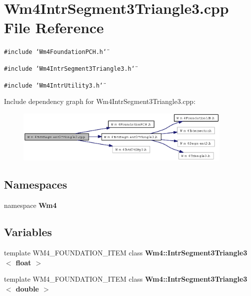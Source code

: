 \section{Wm4Intr\-Segment3Triangle3.cpp File Reference}
\label{Wm4IntrSegment3Triangle3_8cpp}
{\tt \#include \char`\"{}Wm4Foundation\-PCH.h\char`\"{}}\par
{\tt \#include \char`\"{}Wm4Intr\-Segment3Triangle3.h\char`\"{}}\par
{\tt \#include \char`\"{}Wm4Intr\-Utility3.h\char`\"{}}\par


Include dependency graph for Wm4Intr\-Segment3Triangle3.cpp:\begin{figure}[H]
\begin{center}
\leavevmode
\includegraphics[width=297pt]{Wm4IntrSegment3Triangle3_8cpp__incl}
\end{center}
\end{figure}
\subsection*{Namespaces}
\begin{CompactItemize}
\item 
namespace {\bf Wm4}
\end{CompactItemize}
\subsection*{Variables}
\begin{CompactItemize}
\item 
template WM4\_\-FOUNDATION\_\-ITEM class {\bf Wm4::Intr\-Segment3Triangle3$<$ float $>$}
\item 
template WM4\_\-FOUNDATION\_\-ITEM class {\bf Wm4::Intr\-Segment3Triangle3$<$ double $>$}
\end{CompactItemize}
